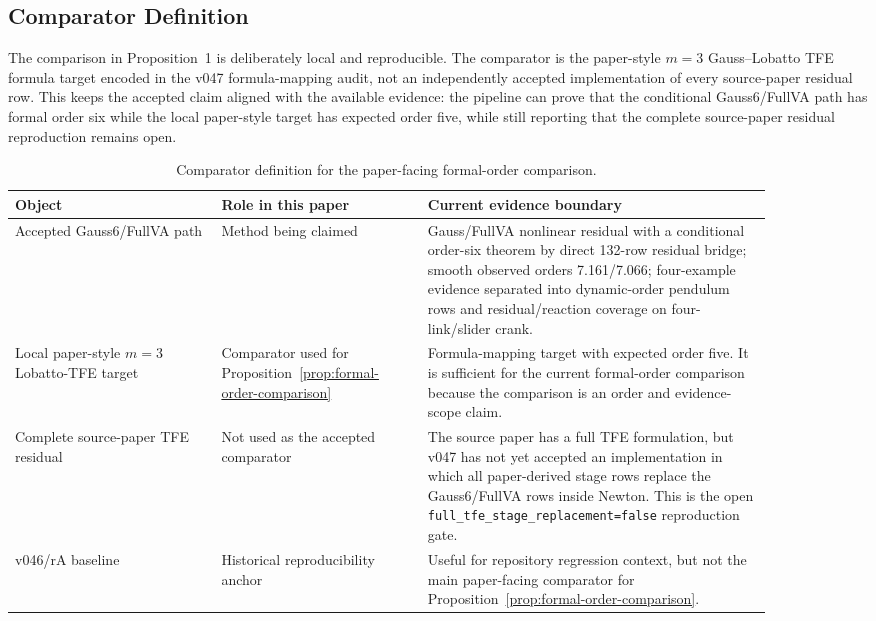 \documentclass[11pt]{article}
\newcommand{\method}{Gauss6/FullVA}
\newcommand{\tfe}{TFE}
\begin{document}
\subsection{Comparator Definition}

The comparison in Proposition~1 is deliberately local and reproducible.  The
comparator is the paper-style $m=3$ Gauss--Lobatto \tfe{} formula target
encoded in the v047 formula-mapping audit, not an independently accepted
implementation of every source-paper residual row.  This keeps the accepted
claim aligned with the available evidence: the pipeline can prove that the
conditional \method{} path has formal order six while the local paper-style
target has expected order five, while still reporting that the complete source-paper
residual reproduction remains open.

\begin{table}[t]
\centering
\caption{Comparator definition for the paper-facing formal-order comparison.}
\label{tab:comparator-definition}
\begin{tabular}{P{0.24\linewidth}P{0.24\linewidth}P{0.40\linewidth}}
\toprule
Object & Role in this paper & Current evidence boundary \\
\midrule
Accepted \method{} path &
Method being claimed &
Gauss/FullVA nonlinear residual with a conditional order-six theorem by direct
132-row residual bridge; smooth observed orders 7.161/7.066; four-example
evidence separated into dynamic-order pendulum rows and residual/reaction
coverage on four-link/slider crank. \\
Local paper-style $m=3$ Lobatto-\tfe{} target &
Comparator used for Proposition~\ref{prop:formal-order-comparison} &
Formula-mapping target with expected order five.  It is sufficient for the
current formal-order comparison because the comparison is an order and
evidence-scope claim. \\
Complete source-paper \tfe{} residual &
Not used as the accepted comparator &
The source paper has a full \tfe{} formulation, but v047 has not yet accepted
an implementation in which all paper-derived stage rows replace the
Gauss6/FullVA rows inside Newton.  This is the open
\nolinkurl{full_tfe_stage_replacement=false} reproduction gate. \\
v046/rA baseline &
Historical reproducibility anchor &
Useful for repository regression context, but not the main paper-facing
comparator for Proposition~\ref{prop:formal-order-comparison}. \\
\bottomrule
\end{tabular}
\end{table}
\end{document}
